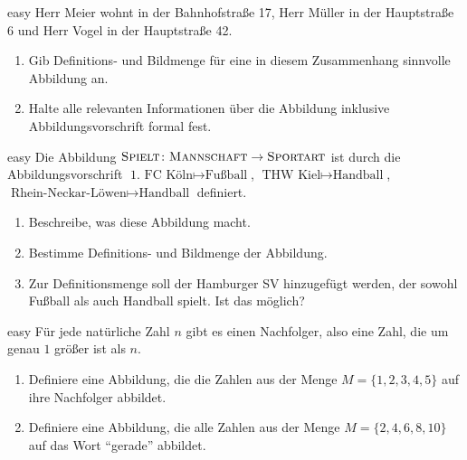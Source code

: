 \documentclass[../funktionen.tex]{subfiles}
\begin{document}
\begin{exercise}{easy}
    Herr Meier wohnt in der Bahnhofstraße 17, Herr Müller in der Hauptstraße 6 und Herr Vogel in der Hauptstraße 42.
    \begin{enumerate}
        \item Gib Definitions- und Bildmenge für eine in diesem Zusammenhang sinnvolle Abbildung an.
        \item Halte alle relevanten Informationen über die Abbildung inklusive Abbildungsvorschrift formal fest.
    \end{enumerate}
\end{exercise}

\begin{exercise}{easy}
    Die Abbildung $\textsc{Spielt}\colon\textsc{Mannschaft}\rightarrow\textsc{Sportart}$ ist durch die
    Abbildungsvorschrift $\text{1. FC Köln}\mapsto\text{Fußball}$, $\text{THW Kiel}\mapsto\text{Handball}$,
    $\text{Rhein-Neckar-Löwen}\mapsto\text{Handball}$ definiert.
    \begin{enumerate}
        \item Beschreibe, was diese Abbildung macht.
        \item Bestimme Definitions- und Bildmenge der Abbildung.
        \item Zur Definitionsmenge soll der Hamburger SV hinzugefügt werden, der sowohl Fußball als auch Handball
            spielt. Ist das möglich?
    \end{enumerate}
\end{exercise}

\begin{exercise}{easy}
    Für jede natürliche Zahl $n$ gibt es einen Nachfolger, also eine Zahl, die um genau $1$ größer ist als $n$. 
    \begin{enumerate}
        \item Definiere eine Abbildung, die die Zahlen aus der Menge $M=\{1,2,3,4,5\}$ auf ihre Nachfolger abbildet.
        \item Definiere eine Abbildung, die alle Zahlen aus der Menge $M=\{2,4,6,8,10\}$ auf das Wort \enquote{gerade}
            abbildet.
    \end{enumerate}
\end{exercise}
\end{document}
